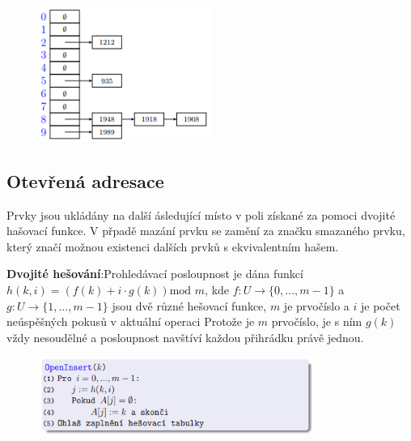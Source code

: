 \documentclass{szzclass}
\begin{document}
\begin{figure}[h!]
\centering
\includegraphics[width=0.5\textwidth]{topics/bi-spol-5/images/hashRetizky.png}
\end{figure}

\subsection{Otevřená adresace}
Prvky jsou ukládány na další ásledující místo v poli získané za pomoci dvojité hašovací funkce. V přpadě mazání prvku se zamění za značku smazaného prvku, který značí možnou existenci dalších prvků s ekvivalentním hašem.

\textbf{Dvojité hešování}:\newline Prohledávací posloupnost je dána funkcí
$h(k, i) = (f(k) + i \cdot g(k)) \text{mod } m$, kde $f : U \rightarrow \{0, . . . , m - 1\}$ a
$g : U → \{1, . . . , m - 1\}$ jsou dvě různé hešovací funkce, $m$ je
prvočíslo a $i$ je počet neúspěšných pokusů v aktuální operaci
Protože je $m$ prvočíslo, je s ním $g(k)$ vždy nesoudělné a
posloupnost navštíví každou přihrádku právě jednou.

\begin{figure}[h!]
\centering
\includegraphics[width=0.8\textwidth]{topics/bi-spol-5/images/hashOpenInsert.png}
\end{figure}
\end{document}
